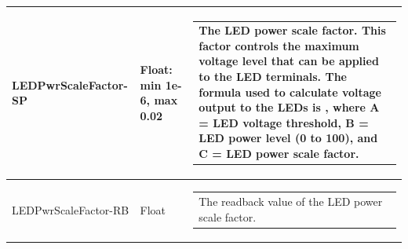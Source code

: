 \documentclass[openany]{article}
\begin{document}
\begin{longtable}{| m{4.5cm} m{2.5cm}  m{7.0cm} |}
        LEDPwrScaleFactor-SP & Float: min 1e-6, max 0.02 & \begin{tabular}{@{}m{6cm}@{}}
                The LED power scale factor. This factor controls the maximum voltage level that can be applied to the LED terminals. The formula used to calculate voltage output to the LEDs is $A.e^{B.C}$, where A = LED voltage threshold, B = LED power level (0 to 100), and C = LED power scale factor.
            \end{tabular} \hypertarget{}{}\\ \hline
        LEDPwrScaleFactor-RB & Float & \begin{tabular}{@{}m{6cm}@{}}
                The readback value of the LED power scale factor.
            \end{tabular} \hypertarget{}{}\\ \hline
    \end{longtable}
\end{document}
